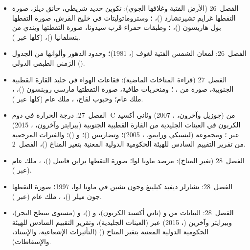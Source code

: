 \begin{itemize}
  \item الفصل~26 (الأرض الفتية وغلافها الجوي): تكوين حديد شريطي، خانق ديلز، صورة التقطها غرايم تشيرتشارد ()، ؛ وستروماتوليتات في خليج القرش، صورة التقطها بول هاريسون ()، ؛ وطبقات حمراء قرب سيدونا، صورة التقطتها ويندي من بنسلفانيا ()،  (كلها عبر ).
  \item الفصل~26: لمعان الشمس الفتية لغوف (، 1981)؛ وحدود الدهور وألوانها من الجدول الزمني الطبقي الدولي ().
  \item الفصل~27 (قراءة المناخات الماضية): فقاعات الهواء في جليد القارة القطبية الجنوبية، صورة من ، ؛ ومنخربات طافية، صورة التقطتها مارسي روبنسون ()، ، ملك عام؛ وحبوب لقاح، ، ملك عام (كلها عبر ).
  \item الفصل~27: درجة الحرارة في دوم~C من  (جوزيل وآخرون، ، 2007) وثاني أكسيد الكربون في العينات الجليدية من القارة القطبية الجنوبية (بيرايتر وآخرون، ، 2015) عبر ؛ ومجموعة  (ليسيكي ورايمو، ، 2005)؛ وتضاريس  ()؛ و ()؛ والفترات المرجعية من تقرير التقييم السادس للهيئة الحكومية الدولية المعنية بتغير المناخ ()، الفصل~2.
  \item الفصل~28 (تغير المناخ): مرصد ماونا لوا؛ صورة التقطها براين فاسل ()، ، ملك عام (عبر ).
  \item الفصل~28: تشارلز ديفيد كيلينغ وجون تشين في ماونا لوا، 1997؛ صورة التقطها جون ميلر ()، ، ملك عام (عبر ).
  \item الفصل~28: البيانات من  و (ثاني أكسيد الكربون)، و ()، و (مستوى سطح البحر)، وبيرايتر وآخرين (، 2015) عبر  (العينات الجليدية)، وتقرير التقييم السادس للهيئة الحكومية الدولية المعنية بتغير المناخ () (التأثيرات الإشعاعية، والإسناد، والإسقاطات).
\end{itemize}
